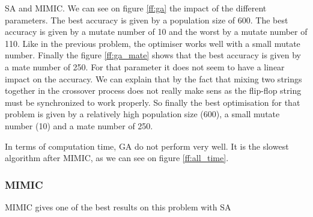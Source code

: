 \documentclass[twocolumn, 10pt]{article}
\begin{document}
				SA and MIMIC. We can see on figure \ref{ff:ga} the impact of the different parameters.
				The best accuracy is given by a population size of 600. The best accuracy is given by a mutate number of 10 and the worst by a mutate number of 110. Like in the previous problem, the optimiser works well with a small mutate number. Finally the figure \ref{ff:ga_mate} shows that the best accuracy is given by a mate number of 250. For that parameter it does not seem to have a linear impact on the accuracy. We can explain that by the fact that mixing two strings together in the crossover process does not really make sens as the flip-flop string must be synchronized to work properly. So finally the best optimisation for that problem is given by a relatively high population size (600), a small mutate number (10) and a mate number of 250.

				In terms of computation time, GA do not perform very well. It is the slowest algorithm after MIMIC, as we can see on figure \ref{ff:all_time}.
			\subsubsection*{MIMIC}
				MIMIC gives one of the best results on this problem with SA
\end{document}
